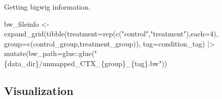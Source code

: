 \documentclass[
  letterpaper,
  DIV=11,
  numbers=noendperiod]{scrartcl}
\newenvironment{Shaded}{\begin{snugshade}}{\end{snugshade}}
\newcommand{\AttributeTok}[1]{\textcolor[rgb]{0.40,0.45,0.13}{#1}}
\newcommand{\DecValTok}[1]{\textcolor[rgb]{0.68,0.00,0.00}{#1}}
\newcommand{\FunctionTok}[1]{\textcolor[rgb]{0.28,0.35,0.67}{#1}}
\newcommand{\NormalTok}[1]{\textcolor[rgb]{0.00,0.23,0.31}{#1}}
\newcommand{\OtherTok}[1]{\textcolor[rgb]{0.00,0.23,0.31}{#1}}
\newcommand{\SpecialCharTok}[1]{\textcolor[rgb]{0.37,0.37,0.37}{#1}}
\newcommand{\StringTok}[1]{\textcolor[rgb]{0.13,0.47,0.30}{#1}}
\begin{document}
Getting bigwig information.

\begin{Shaded}
\begin{Highlighting}[]
\NormalTok{bw\_fileinfo }\OtherTok{\textless{}{-}} \FunctionTok{expand\_grid}\NormalTok{(}\FunctionTok{tibble}\NormalTok{(}\AttributeTok{treatment=}\FunctionTok{rep}\NormalTok{(}\FunctionTok{c}\NormalTok{(}\StringTok{"control"}\NormalTok{,}\StringTok{"treatment"}\NormalTok{),}\AttributeTok{each=}\DecValTok{4}\NormalTok{),}
       \AttributeTok{group=}\FunctionTok{c}\NormalTok{(control\_group,treatment\_group)),}
       \AttributeTok{tag=}\NormalTok{condition\_tag) }\SpecialCharTok{|\textgreater{}}
  \FunctionTok{mutate}\NormalTok{(}\AttributeTok{bw\_path=}\NormalTok{glue}\SpecialCharTok{::}\FunctionTok{glue}\NormalTok{(}\StringTok{"\{data\_dir\}/unmapped\_CTX\_\{group\}\_\{tag\}.bw"}\NormalTok{))}
\end{Highlighting}
\end{Shaded}

\hypertarget{visualization}{%
\subsection{Visualization}\label{visualization}}
\end{document}
